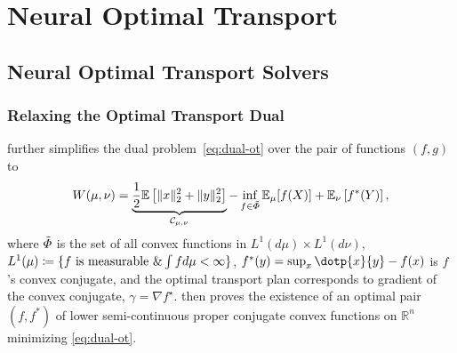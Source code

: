 \chapter{Neural Optimal Transport}
\label{cha:neural_ot}


%

\section{Neural Optimal Transport Solvers}


\subsection{Relaxing the Optimal Transport Dual}

\citet[Theorem 2.9]{villani2021topics} further simplifies the dual problem~\eqref{eq:dual-ot} over the pair of functions $(f, g)$ to
\begin{equation} \label{eq:dual-ot-cvx}
    W(\mu, \nu)= \underbrace{\frac{1}{2}\mathbb{E}\left[\|x\|_{2}^{2}+\|y\|_{2}^{2}\right]}_{\mathcal{C}_{\mu, \nu}}-\inf _{f \in \Tilde{\Phi}} \mathbb{E}_{\mu}[f(X)]+\mathbb{E}_{\nu}\left[f^{*}(Y)\right],
\end{equation}
where $\Tilde{\Phi}$ is the set of all convex functions in $L^1(d\mu) \times L^1(d\nu)$, $L^{1}(\mu) \coloneqq \{f \text{ is measurable } \& \int f d\mu<\infty\}$, $f^*(y) = \sup_x \dotp{x}{y} - f(x)$ is $f$'s convex conjugate, and the optimal transport plan corresponds to gradient of the convex conjugate, $\gamma = \nabla f^\star$. %
\citet[Theorem 2.9]{villani2021topics} then proves the existence of an optimal pair $(f, f^*)$ of lower semi-continuous proper conjugate convex functions on $\mathbb{R}^n$ minimizing \eqref{eq:dual-ot}.

